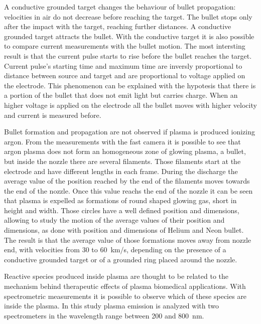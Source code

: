 A conductive grounded target changes the behaviour of bullet propagation: velocities in air do not decrease before reaching the target. The bullet stops only after the impact with the target, reaching further distances. A conductive grounded target attracts the bullet. 
With the conductive target it is also possible to compare current measurements with the bullet motion. The most intersting result is that the current pulse starts to rise before the bullet reaches the target. Current pulse's starting time and maximum time are inversly proportional to distance between source and target and are proportional to voltage applied on the electrode. This phenomenon can be explained with the hypotesis that there is a portion of the bullet that does not emit light but carries charge. When an higher voltage is applied on the electrode all the bullet moves with higher velocity and current is measured before.


Bullet formation and propagation are not observed if plasma is produced ionizing argon. From the measurements with the fast camera it is possible to see that argon plasma does not form an homogeneous zone of glowing plasma, a bullet, but inside the nozzle there are several filaments. Those filaments start at the electrode and have different lengths in each frame. During the discharge the average value of the position reached by the end of the filaments moves towards the end of the nozzle. Once this value reachs the end of the nozzle it can be seen that plasma is expelled as formations of round shaped glowing gas, short in height and width.
Those circles have a well defined position and dimensions, allowing to study the motion of the average values of their position and dimensions, as done with position and dimensions of Helium and Neon bullet. The result is that the average value of those formations moves away from nozzle end, with velocities from \num{30} to \SI{60}{\kilo\meter/\second}, depending on the presence of a conductive grounded target or of a grounded ring placed around the nozzle.


Reactive species produced inside plasma are thought to be related to the mechanism behind therapeutic effects of plasma biomedical applications. With spectrometric measurements it is possible to observe which of these species are inside the plasma.
In this study plasma emission is analyzed with two spectrometers in the wavelength range between \num{200} and \SI{800}{\nano\meter}.


